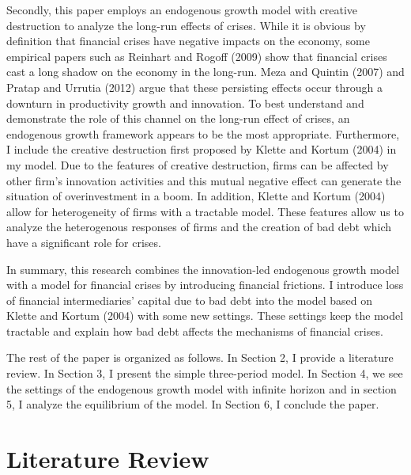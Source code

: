 \documentclass[a4paper,12pt]{article}
\begin{document}
Secondly, this paper employs an endogenous growth model with creative destruction to analyze the long-run effects of crises. While it is obvious by definition that financial crises have negative impacts on the economy, some empirical papers such as Reinhart and Rogoff (2009) show that financial crises cast a long shadow on the economy in the long-run. Meza and Quintin (2007) and Pratap and Urrutia (2012) argue that these persisting effects occur through a downturn in productivity growth and innovation. To best understand and demonstrate the role of this channel on the long-run effect of crises, an endogenous growth framework appears to be the most appropriate. Furthermore, I include the creative destruction first proposed by Klette and Kortum (2004) in my model. Due to the features of creative destruction, firms can be affected by other firm's innovation activities and this mutual negative effect can generate the situation of overinvestment in a boom. In addition, Klette and Kortum (2004) allow for heterogeneity of firms with a tractable model. These features allow us to analyze the heterogenous responses of firms and the creation of bad debt which have a significant role for crises.\par
In summary, this research combines the innovation-led endogenous growth model with a model for financial crises by introducing financial frictions. I introduce loss of financial intermediaries' capital due to bad debt into the model based on Klette and Kortum (2004) with some new settings. These settings keep the model tractable and explain how bad debt affects the mechanisms of financial crises. \par
The rest of the paper is organized as follows. In Section 2, I provide a literature review. In Section 3, I present the simple three-period model. In Section 4, we see the settings of the endogenous growth model with infinite horizon and in section 5, I analyze the equilibrium of the model. In Section 6, I conclude the paper.

\section{Literature Review}
\end{document}

